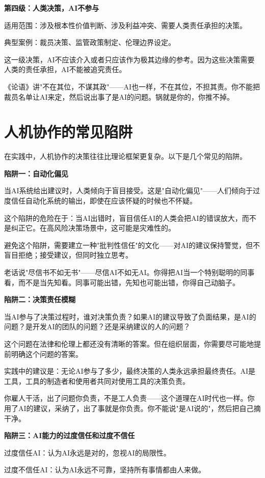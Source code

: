 \textbf{第四级：人类决策，AI不参与}

适用范围：涉及根本性价值判断、涉及利益冲突、需要人类责任承担的决策。

典型案例：裁员决策、监管政策制定、伦理边界设定。

这一级决策，AI不应该介入或者只应该作为极其边缘的参考。因为这些决策需要人类的责任承担，AI不能被追究责任。

《论语》讲"不在其位，不谋其政"——AI也一样，不在其位，不担其责。你不能把裁员名单让AI来定，然后说出事了是AI的问题。锅就是你的，你推不掉。

\section{人机协作的常见陷阱}


在实践中，人机协作的决策往往比理论框架更复杂。以下是几个常见的陷阱。

\textbf{陷阱一：自动化偏见}

当AI系统给出建议时，人类倾向于盲目接受。这是"自动化偏见"——人们倾向于过度信任自动化系统的输出，即使在应该怀疑的时候也不怀疑。

这个陷阱的危险在于：当AI出错时，盲目信任AI的人类会把AI的错误放大，而不是纠正它。在高风险决策场景中，这可能是灾难性的。

避免这个陷阱，需要建立一种"批判性信任"的文化——对AI的建议保持警觉，但不盲目拒绝；接受建议，但同时独立思考。

老话说"尽信书不如无书"——尽信AI不如无AI。你得把AI当一个特别聪明的同事看，而不是当先知看。同事可能出错，先知也可能出错，你得自己动脑子。

\textbf{陷阱二：决策责任模糊}

当AI参与了决策过程时，谁对决策负责？如果AI的建议导致了负面结果，是AI的问题？是开发AI的团队的问题？还是采纳建议的人的问题？

这个问题在法律和伦理上都还没有清晰的答案。但在组织层面，你需要尽可能地提前明确这个问题的答案。

实践中的建议是：无论AI参与了多少，最终决策的人类永远承担最终责任。AI是工具，工具的制造者和使用者共同对使用工具的决策负责。

你雇人干活，出了问题你负责，不是工人负责——这个道理在AI时代也一样。你用了AI的建议，采纳了，出了事就是你负责。你不能说"是AI说的"，然后把自己摘干净。

\textbf{陷阱三：AI能力的过度信任和过度不信任}

过度信任AI：认为AI永远是对的，忽视AI的局限性。

过度不信任AI：认为AI永远不可靠，坚持所有事情都由人来做。

